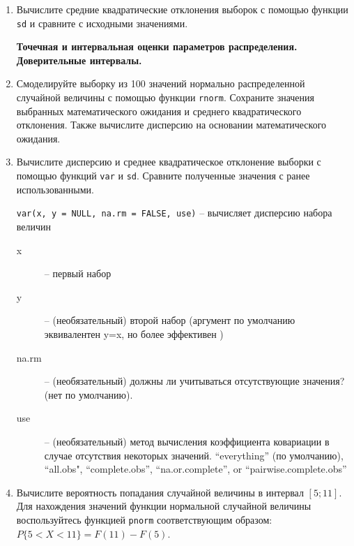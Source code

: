 \begin{enumerate}
    \item Вычислите средние квадратические отклонения выборок с помощью функции \texttt{sd} и сравните
          с исходными значениями.


    \textbf{Точечная и интервальная оценки параметров распределения. Доверительные интервалы.}
    \item Смоделируйте выборку из 100 значений нормально распределенной случайной величины с помощью
          функции \texttt{rnorm}. Сохраните значения выбранных математического ожидания и 
          среднего квадратического отклонения. Также вычислите дисперсию на основании математического 
          ожидания.

    \item Вычислите дисперсию и среднее квадратическое отклонение выборки с помощью 
          функций \texttt{var} и \texttt{sd}. Сравните полученные значения с ранее использованными.

          \begin{mdframed}[style=BadassFrame]

              \texttt{var(x, y = NULL, na.rm = FALSE, use)} -- вычисляет дисперсию набора величин
              \begin{description}

                \item[x] -- первый набор
                \item[y] -- (необязательный) второй набор (аргумент по умолчанию эквивалентен y=x, но более эффективен )
                \item[na.rm] -- (необязательный) должны ли учитываться отсутствующие значения? (нет по умолчанию).
                \item[use] -- (необязательный) метод вычисления коэффициента ковариации в случае отсутствия некоторых значений.
                    ``everything'' (по умолчанию), ``all.obs", ``complete.obs'', ``na.or.complete'', or ``pairwise.complete.obs''
              \end{description}
          \end{mdframed}

    \item Вычислите вероятность попадания случайной величины в интервал $[5;11]$. Для нахождения значений функции
          нормальной случайной величины воспользуйтесь функцией \texttt{pnorm} соответствующим образом: $P\{5<X<11\}=F(11)-F(5)$.

          \begin{mdframed}[style=BadassFrame]


\end{mdframed}
\end{enumerate}
